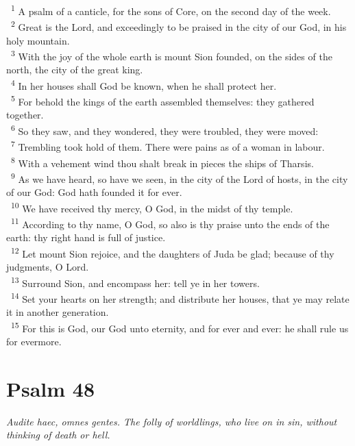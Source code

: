 \documentclass[a5paper,12pt]{article}
\begin{document}
\begin{multicols*}{2}
~\textsuperscript{1} A psalm of a canticle, for the sons of Core, on the second day of the week.\\
~\textsuperscript{2} Great is the Lord, and exceedingly to be praised in the city of our God, in his holy mountain.\\
~\textsuperscript{3} With the joy of the whole earth is mount Sion founded, on the sides of the north, the city of the great king.\\
~\textsuperscript{4} In her houses shall God be known, when he shall protect her.\\
~\textsuperscript{5} For behold the kings of the earth assembled themselves: they gathered together.\\
~\textsuperscript{6} So they saw, and they wondered, they were troubled, they were moved:\\
~\textsuperscript{7} Trembling took hold of them. There were pains as of a woman in labour.\\
~\textsuperscript{8} With a vehement wind thou shalt break in pieces the ships of Tharsis.\\
~\textsuperscript{9} As we have heard, so have we seen, in the city of the Lord of hosts, in the city of our God: God hath founded it for ever.\\
~\textsuperscript{10} We have received thy mercy, O God, in the midst of thy temple.\\
~\textsuperscript{11} According to thy name, O God, so also is thy praise unto the ends of the earth: thy right hand is full of justice.\\
~\textsuperscript{12} Let mount Sion rejoice, and the daughters of Juda be glad; because of thy judgments, O Lord.\\
~\textsuperscript{13} Surround Sion, and encompass her: tell ye in her towers.\\
~\textsuperscript{14} Set your hearts on her strength; and distribute her houses, that ye may relate it in another generation.\\
~\textsuperscript{15} For this is God, our God unto eternity, and for ever and ever: he shall rule us for evermore.\\

\section{Psalm 48}
\label{sec:org18f01f6}
\emph{Audite haec, omnes gentes. The folly of worldlings, who live on in sin, without thinking of death or hell.}\\


\end{multicols*}
\end{document}
